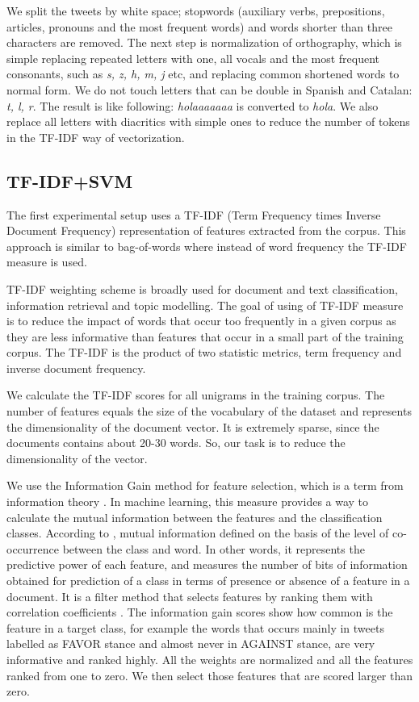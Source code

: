 \documentclass[10pt, a4paper]{article}
\begin{document}
We split the tweets by white space; stopwords (auxiliary verbs, prepositions, articles, pronouns and the most frequent words) and words shorter than three characters are removed. The next step is normalization of orthography, which is simple replacing repeated letters with one, all vocals and the most frequent consonants, such as \textit{s, z, h, m, j} etc, and replacing common shortened words to normal form. We do not touch letters that can be double in Spanish and Catalan: \textit{t, l, r}.  The result is like following: \textit{holaaaaaaa} is converted to \textit{hola}. We also replace all letters with diacritics with simple ones to reduce the number of tokens in the TF-IDF way of vectorization.

\subsection{TF-IDF+SVM}\label{sec:tf-idf+svm}

The first experimental setup uses a TF-IDF (Term Frequency times Inverse Document Frequency) \cite{Jones72astatistical} representation of features extracted from the corpus. This approach is similar to bag-of-words where instead of word frequency the TF-IDF measure is used.

TF-IDF weighting scheme is broadly used for document and text classification, information retrieval and topic modelling. The goal of using of TF-IDF measure is to reduce the impact of words that occur too frequently in a given corpus as they are less informative than features that occur in a small part of the training corpus. The TF-IDF is the product of two statistic metrics, term frequency  and inverse document frequency.

We calculate the TF-IDF scores for all unigrams in the training corpus. The number of features equals the size of the vocabulary of the dataset and represents the dimensionality of the document vector. It is extremely sparse, since the documents contains about 20-30 words. So, our task is to reduce the dimensionality of the vector.

We use the Information Gain method for feature selection, which is a term from information theory \cite{Cover:2006:EIT:1146355}. In machine learning, this measure provides a way to calculate the mutual information between the features and the classification classes. According to \cite{Aggarwal12}, mutual information defined on the basis of the level of co-occurrence between the class and word. In other words, it represents the predictive power of each feature, and measures the number of bits of information obtained for prediction of a class in terms of presence or absence of a feature in a document. It is a filter method that selects features by ranking them with correlation coefficients \cite{guyon03}. The information gain scores show how common is the feature in a target class, for example the words that occurs mainly in tweets labelled as FAVOR stance and almost never in AGAINST stance, are very informative and ranked highly. All the weights are normalized and all the features ranked from one to zero. We then select those features that are scored larger than zero.
\end{document}
